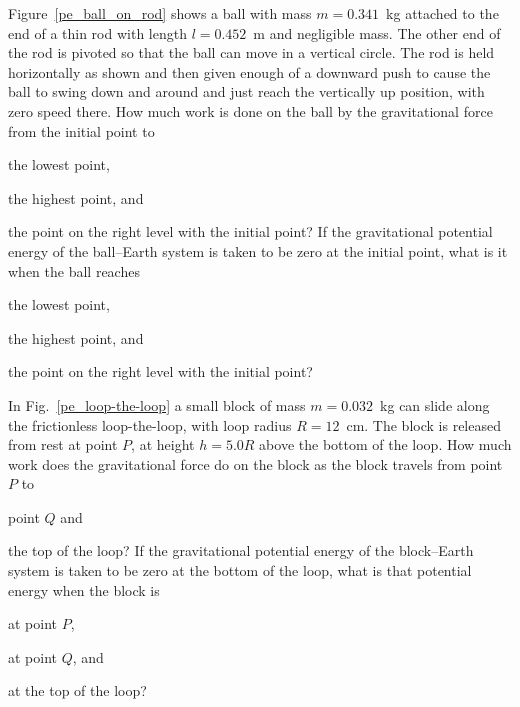 \begin{problem}\label{prb:pe_ball_on_rod}
	Figure~\ref{pe_ball_on_rod} shows a ball with mass $m = 0.341$~kg attached to the end of a thin rod with length $l = 0.452$~m and negligible mass. The other end of the rod is pivoted so that the ball can move in a vertical circle. The rod is held horizontally as shown and then given enough of a downward push to cause the ball to swing down and around and just reach the vertically up position, with zero speed there. How much work is done on the ball by the gravitational force from the initial point to 
	\begin{enumerate*}[label=(\alph*)]
		\item the lowest point,
		\item the highest point, and
		\item the point on the right level with the initial point? If the gravitational potential energy of the ball–Earth system is taken to be zero at the initial point, what is it when the ball reaches
		\item  the lowest point,
		\item the highest point, and
		\item the point on the right level with the initial point? 
	\end{enumerate*}
\end{problem}


\begin{problem}\label{prb:pe_loop-the-loop}
	In Fig.~\ref{pe_loop-the-loop} a small block of mass $m = 0.032$~kg can slide along the frictionless loop-the-loop, with loop radius $R = 12$~cm. The block is released from rest at point $P$, at height $h = 5.0R$ above the bottom of the loop. How much work does the gravitational force do on the block as the block travels from point $P$ to
	\begin{enumerate*}[label=(\alph*)]
		\item \label{pe_loop-the-loop_a} point $Q$ and
		\item the top of the loop?
		If the gravitational potential energy of the block–Earth system is taken to be zero at the bottom of the loop, what is that potential energy when the block is
		\item at point $P$,
		\item at point $Q$, and
		\item \label{pe_loop-the-loop_e} at the top of the loop?
	\end{enumerate*}
\end{problem}

